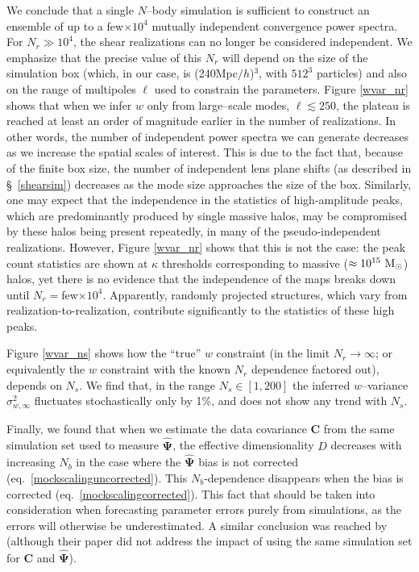 \documentclass[reprint,aps,prd,superscriptaddress,showkeys,showpacs]{revtex4-1}
\newcommand{\bb}[1]{\mathbf{#1}}
\newcommand{\bbh}[1]{\mathbf{\hat{#1}}}
\begin{document}
We conclude that a single $N$--body
simulation is sufficient to construct an ensemble of up to a
few$\times 10^4$ mutually independent convergence power spectra. For
$N_r\gg10^4$, the shear realizations can no longer be considered
independent. We emphasize that the precise value of this $N_r$ will depend on the size of the simulation box (which, in our case, is (240Mpc$/h$)$^3$, with $512^3$ particles) and also on the range of multipoles $\ell$ used to constrain the parameters. Figure \ref{wvar_nr} shows that when we infer $w$ only from large--scale modes, $\ell\lesssim250$, the plateau is reached at least an order of magnitude earlier in the number of realizations. In other words, the number of independent power spectra we can generate decreases as we increase the spatial scales of interest. This is due to the fact that, because of the finite box size, the number of independent lens plane shifts (as described in \S~\ref{shearsim}) decreases as the mode size approaches the size of the box.    Similarly, one may expect that the independence in the statistics of high-amplitude peaks, which are predominantly produced by single massive halos, may be compromised by these halos being present repeatedly, in many of the pseudo-independent realizations.  However, Figure \ref{wvar_nr} shows that this is not the case: the peak count statistics are shown at $\kappa$ thresholds corresponding to massive ($\approx 10^{15}~{\rm M_\odot}$) halos, yet there is no evidence that the independence of the maps breaks down until $N_r=$few$\times 10^4$.  Apparently, randomly projected structures, which vary from realization-to-realization, contribute significantly to the statistics of these high peaks.


Figure \ref{wvar_ns} shows how the ``true'' $w$ constraint (in the
limit $N_r\rightarrow \infty$; or equivalently the $w$ constraint with
the known $N_r$ dependence factored out), depends on $N_s$. We find
that, in the range $N_s\in[1,200]$ the inferred $w$--variance
$\sigma_{w,\infty}^2$ fluctuates stochastically only by 1\%, and does
not show any trend with $N_s$.

Finally, we found that when we estimate the data covariance $\bb{C}$
from the same simulation set used to measure $\bbh{\Psi}$, the
effective dimensionality $D$ decreases with increasing $N_b$ in the
case where the $\bbh{\Psi}$ bias is not corrected
(eq.~\ref{mockscalinguncorrected}).  This $N_b$-dependence disappears
when the bias is corrected (eq.~\ref{mockscalingcorrected}).  This
fact that should be taken into consideration when forecasting
parameter errors purely from simulations, as the errors will otherwise
be underestimated. A similar conclusion was reached by
\citep{Hartlap07} (although their paper did not address the impact of
using the same simulation set for $\bb{C}$ and $\bbh{\Psi}$).
\end{document}
